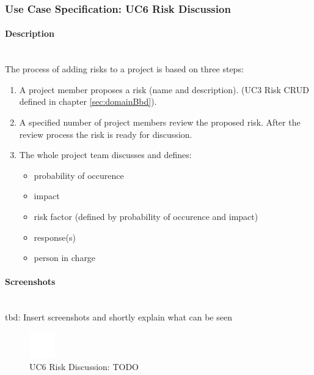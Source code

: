 \subsubsection{Use Case Specification: \ac{UC}6 Risk Discussion}
\label{sec:domainBbg}

\paragraph*{Description}\mbox{}\\
The process of adding risks to a project is based on three steps:
\begin{enumerate}
	\vspace{-3mm}
	\setlength\itemsep{-1em}
	
	\item A project member proposes a risk (name and description). (UC3 Risk CRUD defined in chapter \ref{sec:domainBbd}).
	\item A specified number of project members review the proposed risk. After the review process the risk is ready for discussion.
	\item The whole project team discusses and defines:
	\begin{itemize}
		\vspace{-3mm}
		\setlength\itemsep{-1em}
		
		\item probability of occurence
		\item impact
		\item risk factor (defined by probability of occurence and impact)
		\item response(s)
		\item person in charge
	\end{itemize}
\end{enumerate}

\paragraph*{Screenshots}\mbox{}\\
tbd: Insert screenshots and shortly explain what can be seen
\begin{figure}[h] 
	\centering
	\includegraphics[width=0.1\textwidth]{Content/Domain/placeholder.png}
	\caption{\ac{UC}6 Risk Discussion: TODO}
	\label{fig:label6}
\end{figure}

